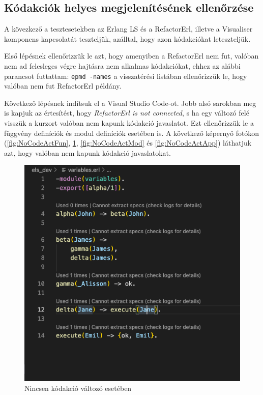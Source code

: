\subsection{Kódakciók helyes megjelenítésének ellenőrzése} \label{codeactionIntro}

A kövezkező a tesztesetekben az Erlang LS és a RefactorErl, illetve a Visualiser komponens kapcsolatát teszteljük, azálltal, hogy azon kódakciókat leteszteljük.


Első lépésnek ellenőrizzük le azt, hogy amenyiben a RefactorErl nem fut, valóban nem ad felesleges végre hajtásra nem alkalmas kódakciókat, ehhez az alábbi parancsot futtattam: \lstinline{epmd -names} a visszatérési listában ellenőrizzük le, hogy valóban nem fut RefactorErl példány. 

Következő lépésnek indítsuk el a Visual Studio Code-ot. Jobb alsó sarokban meg is kapjuk az értesítést, hogy \textit{RefactorErl is not connected}, s ha egy változó felé visszük a kurzort valóban nem kapunk kódakció javaslatot. Ezt ellenőrizzük le a függvény definíciók és modul definíciók esetében is. A következő képernyő fotókon (\ref{fig:NoCodeActFun}, \ref{fig:NoCodeActVar}, \ref{fig:NoCodeActMod} és \ref{fig:NoCodeActApp}) láthatjuk azt, hogy valóban nem kapunk kódakció javaslatokat.


\begin{figure}[H]
  \centering
  \includegraphics[width=0.7\linewidth]{images/testCases/NoCodeActVar.png}
  \caption{Nincsen kódakció változó esetében}
  \label{fig:NoCodeActVar}
\end{figure}

